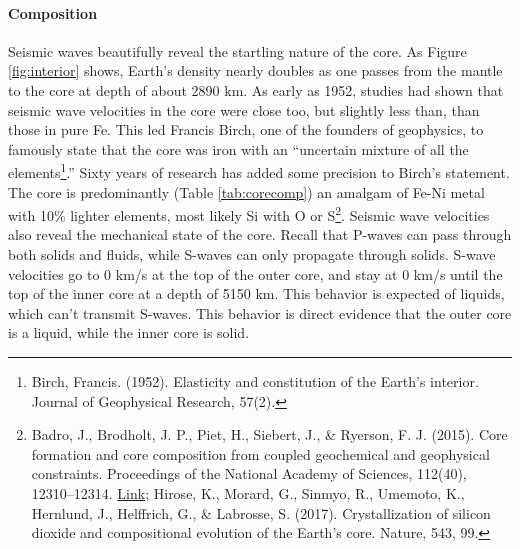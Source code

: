 \documentclass[amstex,12pt]{book}
\begin{document}
\paragraph{Composition}
Seismic waves beautifully reveal the startling nature of the core. As Figure \ref{fig:interior} shows, Earth's density nearly doubles as one passes from the mantle to the core at depth of about 2890 km. As early as 1952, studies had shown that seismic wave velocities in the core were close too, but slightly less than, than those in pure Fe. This led Francis Birch, one of the founders of geophysics, to famously state that the core was iron with an ``uncertain mixture of all the elements\footnote{Birch, Francis. (1952). Elasticity and constitution of the Earth's interior. Journal of Geophysical Research, 57(2).}.'' Sixty years of research has added some precision to Birch's statement. The core is predominantly (Table \ref{tab:corecomp}) an amalgam of Fe-Ni metal with 10\% lighter elements, most likely Si with O or S\footnote{Badro, J., Brodholt, J. P., Piet, H., Siebert, J., \& Ryerson, F. J. (2015). Core formation and core composition from coupled geochemical and geophysical constraints. Proceedings of the National Academy of Sciences, 112(40), 12310–12314. \href{https://doi.org/10.1073/pnas.1505672112}{Link}; Hirose, K., Morard, G., Sinmyo, R., Umemoto, K., Hernlund, J., Helffrich, G., \& Labrosse, S. (2017). Crystallization of silicon dioxide and compositional evolution of the Earth’s core. Nature, 543, 99.}. Seismic wave velocities also reveal the mechanical state of the core. Recall that P-waves can pass through both solids and fluids, while S-waves can only propagate through solids. S-wave velocities go to 0 km/s at the top of the outer core, and stay at 0 km/s until the top of the inner core at a depth of 5150 km. This behavior is expected of liquids, which can’t transmit S-waves. This behavior is direct evidence that the outer core is a liquid, while the inner core is solid.
\end{document}
